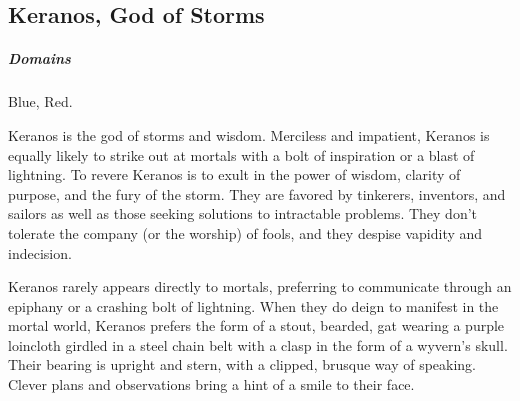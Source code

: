 
\vspace{14.5cm}

\subsection*{Keranos, God of Storms} \label{ssec::keranos}
    \subparagraph{Domains} Blue, Red.

    Keranos is the god of storms and wisdom.
    Merciless and impatient, Keranos is equally likely to strike out at mortals with a bolt of inspiration or a blast of lightning.
    To revere Keranos is to exult in the power of wisdom, clarity of purpose, and the fury of the storm.
    They are favored by tinkerers, inventors, and sailors as well as those seeking solutions to intractable problems.
    They don't tolerate the company (or the worship) of fools, and they despise vapidity and indecision.

    Keranos rarely appears directly to mortals, preferring to communicate through an epiphany or a crashing bolt of lightning.
    When they do deign to manifest in the mortal world, Keranos prefers the form of a stout, bearded, gat wearing a purple loincloth girdled in a steel chain belt with a clasp in the form of a wyvern's skull.
    Their bearing is upright and stern, with a clipped, brusque way of speaking.
    Clever plans and observations bring a hint of a smile to their face.


